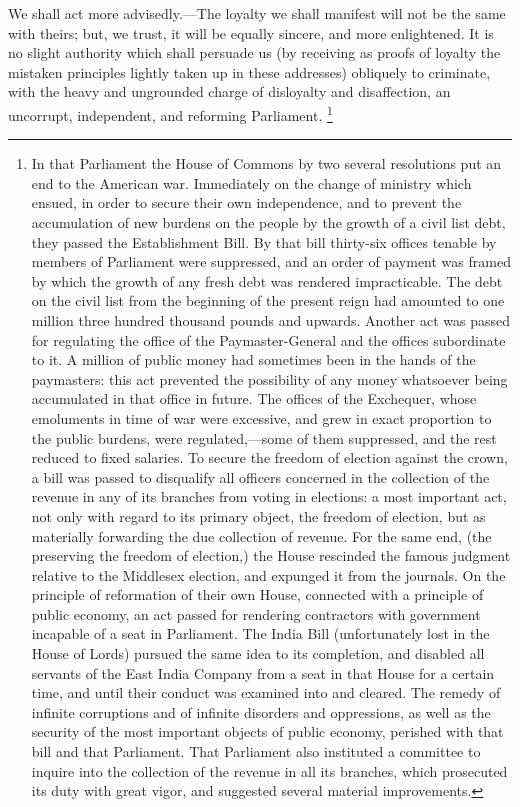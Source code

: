 We shall act more advisedly.—The loyalty we shall manifest will not be the same with theirs; but, we trust, it will be equally sincere, and more enlightened. It is no slight authority which shall persuade us (by receiving as proofs of loyalty the mistaken principles lightly taken up in these addresses) obliquely to criminate, with the heavy and ungrounded charge of disloyalty and disaffection, an uncorrupt, independent, and reforming Parliament. 
\footnote{ In that Parliament the House of Commons by two several resolutions put an end to the American war. Immediately on the change of ministry which ensued, in order to secure their own independence, and to prevent the accumulation of new burdens on the people by the growth of a civil list debt, they passed the Establishment Bill. By that bill thirty-six offices tenable by members of Parliament were suppressed, and an order of payment was framed by which the growth of any fresh debt was rendered impracticable. The debt on the civil list from the beginning of the present reign had amounted to one million three hundred thousand pounds and upwards. Another act was passed for regulating the office of the Paymaster-General and the offices subordinate to it. A million of public money had sometimes been in the hands of the paymasters: this act prevented the possibility of any money whatsoever being accumulated in that office in future. The offices of the Exchequer, whose emoluments in time of war were excessive, and grew in exact proportion to the public burdens, were regulated,—some of them suppressed, and the rest reduced to fixed salaries. To secure the freedom of election against the crown, a bill was passed to disqualify all officers concerned in the collection of the revenue in any of its branches from voting in elections: a most important act, not only with regard to its primary object, the freedom of election, but as materially forwarding the due collection of revenue. For the same end, (the preserving the freedom of election,) the House rescinded the famous judgment relative to the Middlesex election, and expunged it from the journals. On the principle of reformation of their own House, connected with a principle of public economy, an act passed for rendering contractors with government incapable of a seat in Parliament. The India Bill (unfortunately lost in the House of Lords) pursued the same idea to its completion, and disabled all servants of the East India Company from a seat in that House for a certain time, and until their conduct was examined into and cleared. The remedy of infinite corruptions and of infinite disorders and oppressions, as well as the security of the most important objects of public economy, perished with that bill and that Parliament. That Parliament also instituted a committee to inquire into the collection of the revenue in all its branches, which prosecuted its duty with great vigor, and suggested several material improvements.}
